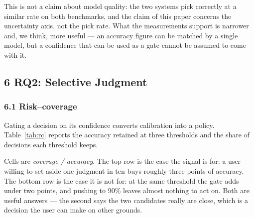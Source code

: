 \documentclass[
]{article}
\begin{document}
This is not a claim about model quality: the two systems pick correctly at a similar rate
on both benchmarks, and the claim of this paper concerns the uncertainty axis, not the
pick rate. What the measurements support is narrower and, we think, more useful --- an
accuracy figure can be matched by a single model, but a confidence that can be used as a
gate cannot be assumed to come with it.

\subsection{6 RQ2: Selective Judgment}\label{rq2}

\subsubsection{6.1 Risk--coverage}\label{risk-coverage}

Gating a decision on its confidence converts calibration into a policy. Table~\ref{tab:rc} reports
the accuracy retained at three thresholds and the share of decisions each threshold
keeps.

\begin{table}[ht]
\centering
\small
\caption{Selective judgment: coverage and accuracy at three confidence thresholds.}\label{tab:rc}
\end{table}

Cells are \emph{coverage / accuracy}. The top row is the case the signal is for: a user
willing to set aside one judgment in ten buys roughly three points of accuracy. The
bottom row is the case it is not for: at the same threshold the gate adds under two
points, and pushing to 90\% leaves almost nothing to act on. Both are useful answers ---
the second says the two candidates really are close, which is a decision the user can
make on other grounds.
\end{document}
